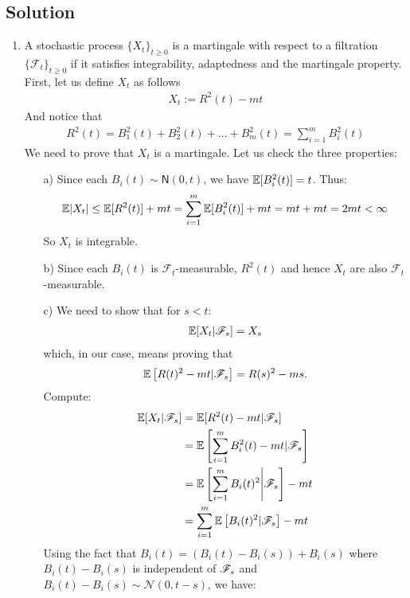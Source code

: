 \documentclass[12pt]{article}
\begin{document}
	\subsection*{Solution}
	\begin{enumerate}
		\item A stochastic process $\{X_t\}_{t\geq0}$ is a martingale with respect to a filtration $\{\mathcal{F}_t\}_{t\geq0}$ if it satisfies integrability, adaptedness and the martingale property. First, let us define $X_t$ as follows
		\begin{align*}
			X_t := R^2(t) - mt 
		\end{align*}
		And notice that
		\begin{align*}
			R^2(t) = B_1^2(t)+B_2^2(t)+...+B_m^2(t) = \sum_{i=1}^m B_i^2(t)
		\end{align*}
		We need to prove that $X_t$ is a martingale. Let us check the three properties:
		\begin{enumerate}
			\item[a)] Since each $B_i(t) \sim \mathsf{N}(0, t)$, we have $\mathbb{E}[B_i^2(t)]= t$. Thus:
			\begin{align*}
				\mathbb{E}{|X_t|} \leq \mathbb{E}[R^2(t)] + mt = \sum_{i=1}^m\mathbb{E}[B_i^2(t)] + mt = mt + mt = 2mt < \infty
			\end{align*}
			So $X_t$ is integrable.
			\item[b)] Since each $B_i(t)$ is $\mathcal{F}_t$-measurable, $R^2(t)$ and hence $X_t$ are also $\mathcal{F}_t$-measurable.
			\item[c)] We need to show that for $s<t$: 
			\begin{align*}
				\mathbb{E}[X_t|\mathscr{F}_s]=X_s
			\end{align*}
			which, in our case, means proving that
			\begin{equation*}
				\mathbb{E}\left[R(t)^2-mt|\mathscr{F}_s\right]=R(s)^2-ms.
			\end{equation*}
			Compute:
			\begin{align*}
				\mathbb{E}[X_t|\mathscr{F}_s]&= \mathbb{E}[R^2(t)-mt|\mathscr{F}_s] \\&=\mathbb{E}\left[ \sum_{i=1}^m B_i^2(t) - mt | \mathscr{F}_s\right]\\
				&=\mathbb{E} \left[\sum_{i=1}^{m}B_i(t)^2\middle|\mathscr{F}_s\right]-mt\\
				&=\sum_{i=1}^m\mathbb{E}\left[B_i(t)^2|\mathscr{F}_s\right]-mt
			\end{align*}
			Using the fact that $B_i(t) = (B_i(t) - B_i(s)) + B_i(s)$ where $B_i(t) - B_i(s)$ is independent of $\mathscr{F}_s$ and $B_i(t) - B_i(s) \sim \mathcal{N}(0, t-s)$, we have:
			\begin{align*}

\end{align*}
\end{enumerate}
\end{enumerate}
\end{document}
